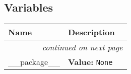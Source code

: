 
  \subsection{Variables}

    \vspace{-1cm}
\hspace{\varindent}\begin{longtable}{|p{\varnamewidth}|p{\vardescrwidth}|l}
\cline{1-2}
\cline{1-2} \centering \textbf{Name} & \centering \textbf{Description}& \\
\cline{1-2}
\endhead\cline{1-2}\multicolumn{3}{r}{\small\textit{continued on next page}}\\\endfoot\cline{1-2}
\endlastfoot\raggedright \_\-\_\-p\-a\-c\-k\-a\-g\-e\-\_\-\_\- & \raggedright \textbf{Value:} 
{\tt None}&\\
\cline{1-2}
\end{longtable}

